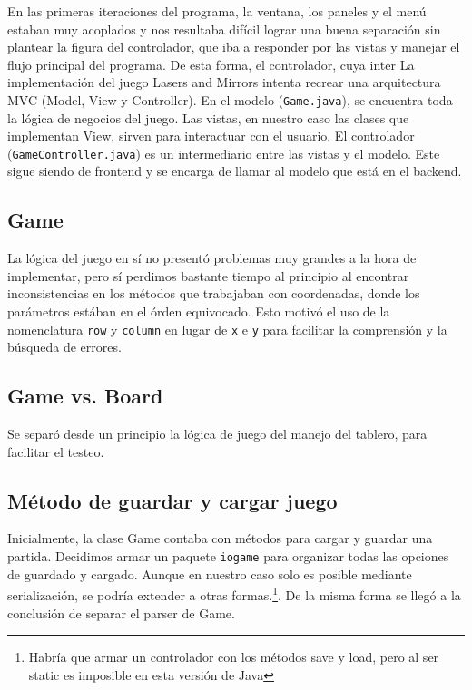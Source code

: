 \documentclass[a4paper, 11pt]{article}
\begin{document}
	En las primeras iteraciones del programa, la ventana, los paneles y el menú estaban muy acoplados y nos resultaba difícil lograr una buena separación sin plantear la figura del controlador, que iba a responder por las vistas y manejar el flujo principal del programa. De esta forma, el controlador, cuya inter La implementación del juego Lasers and Mirrors intenta recrear una arquitectura MVC (Model, View y Controller). En el modelo (\texttt{Game.java}), se encuentra toda la lógica de negocios del juego. Las vistas, en nuestro caso las clases que implementan View, sirven para interactuar con el usuario. El controlador (\texttt{GameController.java}) es un intermediario entre las vistas y el modelo. Este sigue siendo de frontend y se encarga de llamar al modelo que está en el backend.

	\subsection{Game}
	La lógica del juego en sí no presentó problemas muy grandes a la hora de implementar, pero sí perdimos bastante tiempo al principio al encontrar inconsistencias en los métodos que trabajaban con coordenadas, donde los parámetros estában en el órden equivocado. Esto motivó el uso de la nomenclatura \texttt{row} y \texttt{column} en lugar de \texttt{x} e \texttt{y} para facilitar la comprensión y la búsqueda de errores. 

	\subsection{Game vs. Board}
	Se separó desde un principio la lógica de juego del manejo del tablero, para facilitar el testeo.
		
	\subsection{Método de guardar y cargar juego}
	Inicialmente, la clase Game contaba con métodos para cargar y guardar una partida. Decidimos armar un paquete \texttt{iogame} para organizar todas las opciones de guardado y cargado. Aunque en nuestro caso solo es posible mediante serialización, se podría extender a otras formas.\footnote{Habría que armar un controlador con los métodos save y load, pero al ser static es imposible en esta versión de Java}. De la misma forma se llegó a la conclusión de separar el parser de Game.
\end{document}
